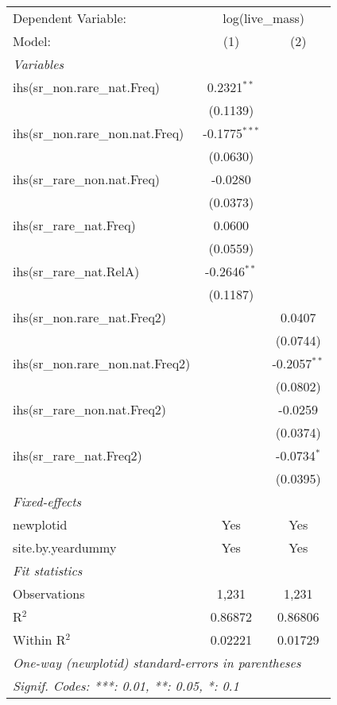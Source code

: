 \begin{tabular}{lcc}
\tabularnewline\midrule\midrule
Dependent Variable:&\multicolumn{2}{c}{log(live\_mass)}\\
Model:&(1) & (2)\\
\midrule \emph{Variables}&   &  \\
ihs(sr\_non.rare\_nat.Freq)&0.2321$^{**}$ &   \\
  &(0.1139) &   \\
ihs(sr\_non.rare\_non.nat.Freq)&-0.1775$^{***}$ &   \\
  &(0.0630) &   \\
ihs(sr\_rare\_non.nat.Freq)&-0.0280 &   \\
  &(0.0373) &   \\
ihs(sr\_rare\_nat.Freq)&0.0600 &   \\
  &(0.0559) &   \\
ihs(sr\_rare\_nat.RelA)&-0.2646$^{**}$ &   \\
  &(0.1187) &   \\
ihs(sr\_non.rare\_nat.Freq2)&   & 0.0407\\
  &   & (0.0744)\\
ihs(sr\_non.rare\_non.nat.Freq2)&   & -0.2057$^{**}$\\
  &   & (0.0802)\\
ihs(sr\_rare\_non.nat.Freq2)&   & -0.0259\\
  &   & (0.0374)\\
ihs(sr\_rare\_nat.Freq2)&   & -0.0734$^{*}$\\
  &   & (0.0395)\\
\midrule \emph{Fixed-effects}&   &  \\
newplotid & Yes & Yes\\
site.by.yeardummy & Yes & Yes\\
\midrule \emph{Fit statistics}&  & \\
Observations & 1,231&1,231\\
R$^2$ & 0.86872&0.86806\\
Within R$^2$ & 0.02221&0.01729\\
\midrule\midrule\multicolumn{3}{l}{\emph{One-way (newplotid) standard-errors in parentheses}}\\
\multicolumn{3}{l}{\emph{Signif. Codes: ***: 0.01, **: 0.05, *: 0.1}}\\
\end{tabular}


